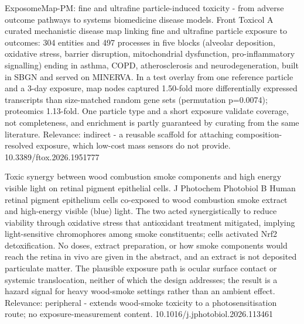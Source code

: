 \documentclass[10pt]{article}
\begin{document}
{ExposomeMap-PM: fine and ultrafine particle-induced toxicity - from adverse outcome pathways to systems biomedicine disease models.}
{Front Toxicol}
{A curated mechanistic disease map linking fine and ultrafine particle exposure to outcomes: 304 entities and 497 processes in five blocks (alveolar deposition, oxidative stress, barrier disruption, mitochondrial dysfunction, pro-inflammatory signalling) ending in asthma, COPD, atherosclerosis and neurodegeneration, built in SBGN and served on MINERVA. In a test overlay from one reference particle and a 3-day exposure, map nodes captured 1.50-fold more differentially expressed transcripts than size-matched random gene sets (permutation p=0.0074); proteomics 1.13-fold. One particle type and a short exposure validate coverage, not completeness, and enrichment is partly guaranteed by curating from the same literature. Relevance: indirect - a reusable scaffold for attaching composition-resolved exposure, which low-cost mass sensors do not provide.}
{10.3389/ftox.2026.1951777}

{Toxic synergy between wood combustion smoke components and high energy visible light on retinal pigment epithelial cells.}
{J Photochem Photobiol B}
{Human retinal pigment epithelium cells co-exposed to wood combustion smoke extract and high-energy visible (blue) light. The two acted synergistically to reduce viability through oxidative stress that antioxidant treatment mitigated, implying light-sensitive chromophores among smoke constituents; cells activated Nrf2 detoxification. No doses, extract preparation, or how smoke components would reach the retina in vivo are given in the abstract, and an extract is not deposited particulate matter. The plausible exposure path is ocular surface contact or systemic translocation, neither of which the design addresses; the result is a hazard signal for heavy wood-smoke settings rather than an ambient effect. Relevance: peripheral - extends wood-smoke toxicity to a photosensitisation route; no exposure-measurement content.}
{10.1016/j.jphotobiol.2026.113461}

\par{}\baselineskip{}\baselineskip
{}
\end{document}
